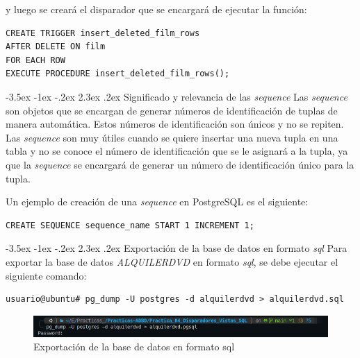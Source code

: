 \documentclass{report}
\makeatletter
\renewcommand\chapter{\@startsection{chapter}{0}{\z@}%
    {-3.5ex \@plus -1ex \@minus -.2ex}%
    {2.3ex \@plus.2ex}%
    {\normalfont\Large\bfseries}}
\makeatother
\begin{document}
y luego se creará el disparador que se encargará de ejecutar la función:
\begin{verbatim}
CREATE TRIGGER insert_deleted_film_rows
AFTER DELETE ON film
FOR EACH ROW
EXECUTE PROCEDURE insert_deleted_film_rows();
\end{verbatim}

\cleardoublepage

\chapter{Significado y relevancia de las \emph{sequence}}
Las \emph{sequence} son objetos que se encargan de generar números de identificación de tuplas de manera automática.
Estos números de identificación son únicos y no se repiten. Las \emph{sequence} son muy útiles cuando se quiere
insertar una nueva tupla en una tabla y no se conoce el número de identificación que se le asignará a la tupla, ya
que la \emph{sequence} se encargará de generar un número de identificación único para la tupla.

Un ejemplo de creación de una \emph{sequence} en PostgreSQL es el siguiente:
\begin{verbatim}
CREATE SEQUENCE sequence_name START 1 INCREMENT 1;
\end{verbatim}


\chapter{Exportación de la base de datos en formato \emph{sql}}
Para exportar la base de datos \emph{ALQUILERDVD} en formato \emph{sql}, se debe ejecutar el siguiente comando:
\begin{verbatim}
usuario@ubuntu# pg_dump -U postgres -d alquilerdvd > alquilerdvd.sql
\end{verbatim}

\begin{figure}[H]
  \centering
  \includegraphics[scale=0.55]{img/export_db.png}
  \caption{Exportación de la base de datos en formato sql}
  \label{fig:exportación de la base de datos en formato sql}
\end{figure}
\end{document}
